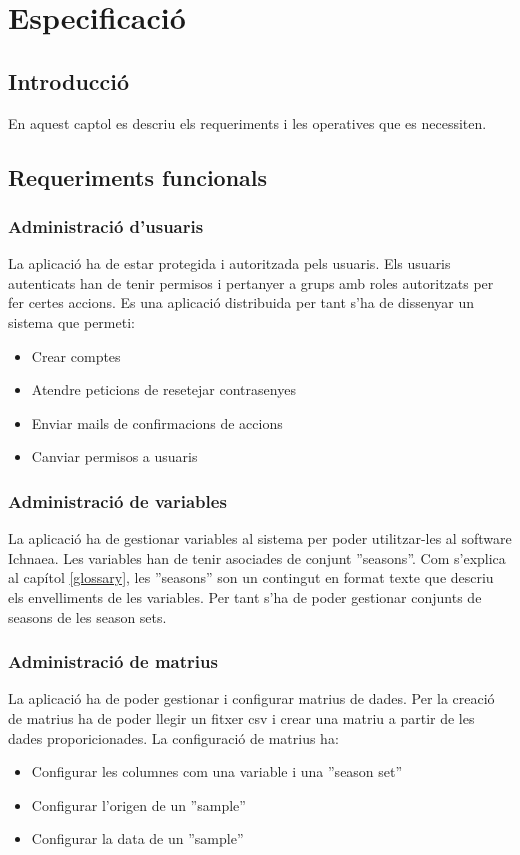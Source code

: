 \chapter{Especificaci\'{o}}
\label{cha:specification}


\section{Introducci\'{o}}
En aquest captol es descriu els requeriments i les operatives que es necessiten.\\


\section{Requeriments funcionals}

\subsection{Administraci\'{o} d'usuaris}
La aplicaci\'{o} ha de estar protegida i autoritzada pels usuaris. Els usuaris autenticats han de tenir permisos i  pertanyer a grups amb roles autoritzats per fer certes accions. Es una aplicaci\'{o} distribuida per tant s'ha de dissenyar un sistema que permeti:
\begin{itemize}
\item Crear comptes
\item Atendre peticions de resetejar contrasenyes
\item Enviar mails de confirmacions de accions
\item Canviar permisos a usuaris
\end{itemize}

\subsection{Administraci\'{o} de variables}
La aplicaci\'{o} ha de gestionar variables al sistema per poder utilitzar-les al software Ichnaea. Les variables han de tenir asociades de conjunt ''seasons''. Com s'explica al cap\'{i}tol \ref{glossary}, les ''seasons'' son un contingut en format texte que descriu els envelliments de les variables. Per tant s'ha de poder gestionar conjunts de seasons de les season sets.\\

\subsection{Administraci\'{o} de matrius}
La aplicaci\'{o} ha de poder gestionar i configurar matrius de dades. Per la creaci\'{o} de matrius ha de poder llegir un fitxer csv i crear una matriu a partir de les dades proporicionades.
La configuraci\'{o} de matrius ha:
\begin{itemize}
\item Configurar les columnes com una variable i una ''season set''
\item Configurar l'origen de un ''sample''
\item Configurar la data de un ''sample''
\end{itemize}

